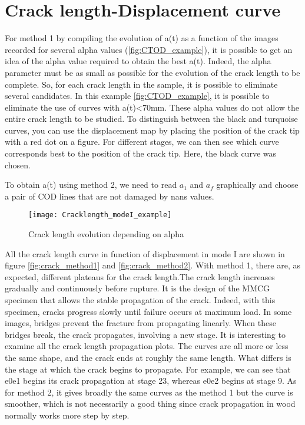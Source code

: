 \section{Crack length-Displacement curve}

For method 1 by compiling the evolution of a(t) as a function of the images recorded for several alpha values (\ref{fig:CTOD_example}), it is possible to get an idea of the alpha value required to obtain the best a(t). Indeed, the alpha parameter must be as small as possible for the evolution of the crack length to be complete. So, for each crack length in the sample, it is possible to eliminate several candidates. In this example \ref{fig:CTOD_example}, it is possible to eliminate the use of curves with a(t)<70mm. These alpha values do not allow the entire crack length to be studied. To distinguish between the black and turquoise curves, you can use the displacement map by placing the position of the crack tip with a red dot on a figure. For different stages, we can then see which curve corresponds best to the position of the crack tip. Here, the black curve was chosen.

To obtain a(t) using method 2, we need to read $a_1$ and $a_f$ graphically and choose a pair of COD lines that are not damaged by nans values.

\begin{figure}[htp]
	\centering
	\texttt{[image: Cracklength\_modeI\_example]}
	\caption{Crack length evolution depending on alpha}
	\label{fig:Cracklength_modeI_example}
\end{figure}

All the crack length curve in function of displacement in mode I are shown in figure \ref{fig:crack_method1} and \ref{fig:crack_method2}. 
With method 1, there are, as expected, different plateaus for the crack length.The crack length increases gradually and continuously before rupture. It is the design of the MMCG specimen that allows the stable propagation of the crack. Indeed, with this specimen, cracks progress slowly until failure occurs at maximum load. In some images, bridges prevent the fracture from propagating linearly. When these bridges break, the crack propagates, involving a new stage. It is interesting to examine all the crack length propagation plots.  The curves are all more or less the same shape, and the crack ends at roughly the same length. What differs is the stage at which the crack begins to propagate. For example, we can see that e0e1 begins its crack propagation at stage 23, whereas e0e2 begins at stage 9.
As for method 2, it gives broadly the same curves as the method 1 but the curve is smoother, which is not necessarily a good thing since crack propagation in wood normally works more step by step.

